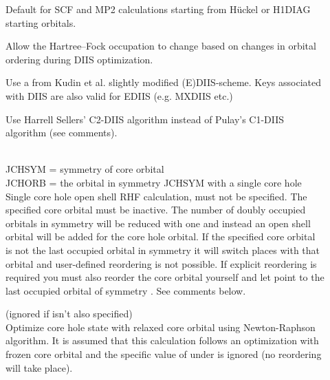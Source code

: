 \begin{description}
\item[]
  Default for SCF and
  MP2 calculations
  starting from H\"{u}ckel or H1DIAG
  starting orbitals.

  Allow the Hartree--Fock occupation to
  change based on changes in orbital ordering during DIIS optimization.

\item[]
  Use a from Kudin et al. slightly modified (E)DIIS-scheme.
  Keys associated with DIIS are also valid for EDIIS (e.g. MXDIIS etc.)

\item[]
  Use Harrell Sellers' C2-DIIS algorithm instead of Pulay's C1-DIIS algorithm
  (see comments).

\item[]
   \\
  JCHSYM = symmetry of core orbital\\
  JCHORB = the orbital in symmetry JCHSYM with a single core hole\\
  Single core hole open shell RHF calculation,  must not
  be specified.  The specified core orbital must be
  inactive.
  The number of doubly occupied orbitals in symmetry  will be reduced with one
  and instead an open shell orbital will be added for the core hole orbital.
  If the specified core orbital is not the last occupied orbital in symmetry
   it will switch places with that orbital and user-defined reordering
  is not possible.
  If explicit reordering is required you must also reorder
  the core orbital yourself and let  point to the last occupied orbital
  of symmetry .  See comments below.

\item[]
  (ignored if  isn't also specified)\\
  Optimize core hole state with relaxed
  core orbital using Newton-Raphson algorithm.
  It is assumed that this calculation follows an optimization
  with frozen core orbital and the specific value of
   under  is ignored (no
  reordering will take place).


\end{description}
